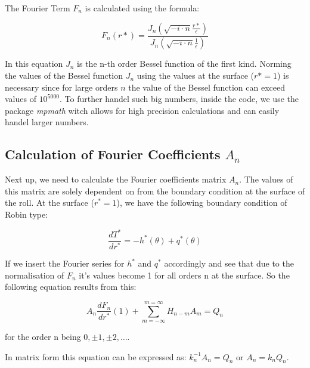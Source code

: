 \documentclass[11pt]{PyRollDocs}
\begin{document}
    The Fourier Term $F_n$ is calculated using the formula:

    \begin{equation}
        F_n(r*) = \frac{J_n\left( \sqrt{-i \cdot n} \frac{r*}{\epsilon}\right)}{J_n\left( \sqrt{-i \cdot n} \frac{1}{\epsilon}\right)}
        \label{eq:6}
    \end{equation}

    In this equation $J_n$ is the n-th order Bessel function of the first kind.
    Norming the values of the Bessel function $J_n$ using the values at the surface ($r* = 1$) is necessary since for large orders $n$ the value of the Bessel function can exceed values of $10^{5000}$.
    To further handel such big numbers, inside the code, we use the package \emph{mpmath} witch allows for high precision calculations and can easily handel larger numbers.

    \subsection*{Calculation of Fourier Coefficients $A_n$}
    Next up, we need to calculate the Fourier coefficients matrix $A_n$.
    The values of this matrix are solely dependent on from the boundary condition at the surface of the roll.
    At the surface ($r^* = 1$), we have the following boundary condition of Robin type:

    \begin{equation}
        \frac{dT^*}{dr^*} = -h^*(\theta) + q^*(\theta)
        \label{eq:7}
    \end{equation}

    If we insert the Fourier series for $h^*$ and $q^*$ accordingly and see that due to the normalisation of $F_n$ it's values become 1 for all orders n at the surface.
    So the following equation results from this:

    \begin{equation}
        A_n \frac{dF_n}{dr^*} (1) + \sum_{m=-\infty}^{m=\infty} H_{n-m}A_m = Q_n
        \label{eq:8}
    \end{equation}

    for the order n being $0, \pm 1, \pm 2, \ldots$.

    In matrix form this equation can be expressed as: $k_n^{-1}A_n = Q_n$ or $A_n = k_nQ_n$.
\end{document}
